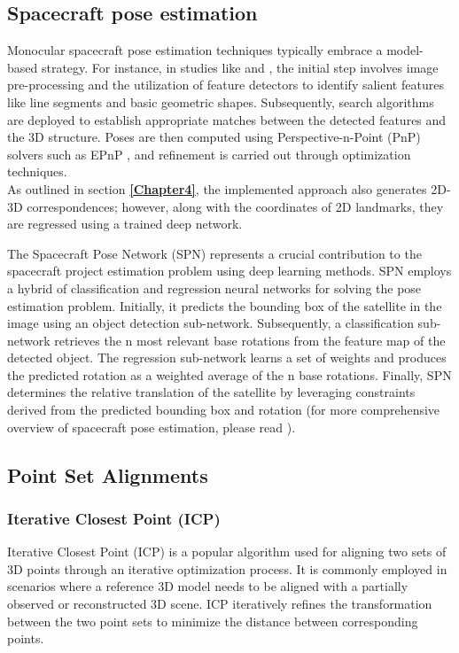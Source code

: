 \subsection{Spacecraft pose estimation}
Monocular spacecraft pose estimation techniques typically embrace a model-based strategy. For instance, in studies like \cite{DAmico2014PoseEO} and \cite{Sharma2018RobustMM}, the initial step involves image pre-processing and the utilization of feature detectors to identify salient features like line segments and basic geometric shapes. Subsequently, search algorithms are deployed to establish appropriate matches between the detected features and the 3D structure. Poses are then computed using Perspective-n-Point (PnP) solvers such as EPnP \cite{Lepetit2009EPnPAA}, and refinement is carried out through optimization techniques.\\
As outlined in section \textbf{\ref{Chapter4}}, the implemented approach also generates 2D-3D correspondences; however, along with the coordinates of 2D landmarks, they are regressed using a trained deep network.

The Spacecraft Pose Network (SPN) \cite{SPN} represents a crucial contribution to the spacecraft project estimation problem using deep learning methods. SPN employs a hybrid of classification and regression neural networks for solving the pose estimation problem. Initially, it predicts the bounding box of the satellite in the image using an object detection sub-network. Subsequently, a classification sub-network retrieves the n most relevant base rotations from the feature map of the detected object. The regression sub-network learns a set of weights and produces the predicted rotation as a weighted average of the n base rotations. Finally, SPN determines the relative translation of the satellite by leveraging constraints derived from the predicted bounding box and rotation (for more comprehensive overview of spacecraft pose estimation, please read \cite{Cassinis2019DelftUO}).

\subsection{Point Set Alignments}

\subsubsection{Iterative Closest Point (ICP)}
Iterative Closest Point (ICP) \cite{ICP} is a popular algorithm used for aligning two sets of 3D points through an iterative optimization process. It is commonly employed in scenarios where a reference 3D model needs to be aligned with a partially observed or reconstructed 3D scene. ICP iteratively refines the transformation between the two point sets to minimize the distance between corresponding points.

